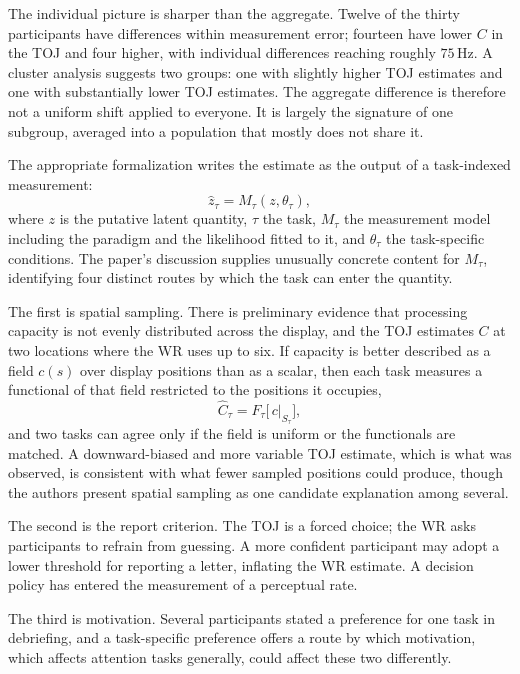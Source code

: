 \documentclass[11pt]{article}
\theoremstyle{definition}
\theoremstyle{remark}
\begin{document}
The individual picture is sharper than the aggregate. Twelve of the thirty participants have differences within measurement error; fourteen have lower $C$ in the TOJ and four higher, with individual differences reaching roughly $75$\,Hz. A cluster analysis suggests two groups: one with slightly higher TOJ estimates and one with substantially lower TOJ estimates. The aggregate difference is therefore not a uniform shift applied to everyone. It is largely the signature of one subgroup, averaged into a population that mostly does not share it.

The appropriate formalization writes the estimate as the output of a task-indexed measurement:
\begin{equation}
\hat{z}_\tau = M_\tau(z, \theta_\tau),
\end{equation}
where $z$ is the putative latent quantity, $\tau$ the task, $M_\tau$ the measurement model including the paradigm and the likelihood fitted to it, and $\theta_\tau$ the task-specific conditions. The paper's discussion supplies unusually concrete content for $M_\tau$, identifying four distinct routes by which the task can enter the quantity.

The first is spatial sampling. There is preliminary evidence that processing capacity is not evenly distributed across the display, and the TOJ estimates $C$ at two locations where the WR uses up to six. If capacity is better described as a field $c(s)$ over display positions than as a scalar, then each task measures a functional of that field restricted to the positions it occupies,
\begin{equation}
\hat{C}_\tau = F_\tau\big[\, c|_{S_\tau} \big],
\end{equation}
and two tasks can agree only if the field is uniform or the functionals are matched. A downward-biased and more variable TOJ estimate, which is what was observed, is consistent with what fewer sampled positions could produce, though the authors present spatial sampling as one candidate explanation among several.

The second is the report criterion. The TOJ is a forced choice; the WR asks participants to refrain from guessing. A more confident participant may adopt a lower threshold for reporting a letter, inflating the WR estimate. A decision policy has entered the measurement of a perceptual rate.

The third is motivation. Several participants stated a preference for one task in debriefing, and a task-specific preference offers a route by which motivation, which affects attention tasks generally, could affect these two differently.
\end{document}
